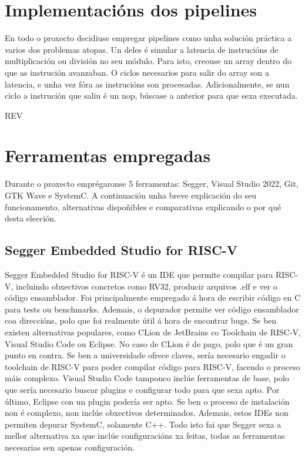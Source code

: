 \section{Implementacións dos pipelines}\label{sec:implt_pipelines}
En todo o proxecto decidiuse empregar pipelines como unha solución práctica a varios dos problemas atopas. Un deles é simular a latencia de instrucións de multiplicación ou división no seu módulo. Para isto, creouse un array dentro do que as instrución avanzaban. O ciclos necesarios para salir do array son a latencia, e unha vez fóra as instrucións son procesadas. Adicionalmente, se nun ciclo a instrución que saliu é un \acrfull{nop}, búscase a anterior para que sexa executada. 

REV

\section{Ferramentas empregadas}\label{sec:ferramentas}
Durante o proxecto emprégaronse 5 ferramentas: Segger, Visual Studio 2022, Git, GTK Wave e SystemC. A continuación unha breve explicación do seu funcionamento, alternativas dispoñibles e comparativas explicando o por qué desta elección.

\subsection{Segger Embedded Studio for RISC-V}\label{sec:segger}
Segger Embedded Studio for RISC-V é un IDE que permite compilar para RISC-V, incluindo obxectivos concretos como RV32, producir arquivos .elf e ver o código ensamblador. Foi principalmente empregado á hora de escribir código en C para \gls{tests} ou \gls{benchmarks}. Ademais, o depurador permite ver código ensamblador coa direccións, polo que foi realmente útil á hora de encontrar bugs. Se ben existen alternativas populares, como CLion de JetBrains co Toolchain de RISC-V, Visual Studio Code ou Eclipse. No caso de CLion é de pago, polo que é un gran punto en contra. Se ben a universidade ofrece claves, sería necesario engadir o toolchain de RISC-V para poder compilar código para RISC-V, facendo o proceso máis complexo. Visual Studio Code tampouco inclúe ferramentas de base, polo que sería necesario buscar plugins e configurar todo para que sexa apto. Por último, Eclipse con un plugin podería ser apto. Se ben o proceso de instalación non é complexo, non inclúe obxectivos determinados. Ademais, estos IDEs non permiten depurar SystemC, solamente C++. Todo isto fai que Segger sexa a mellor alternativa xa que inclúe configuracións xa feitas, todas as ferramentas necesarias sen apenas configuración.


